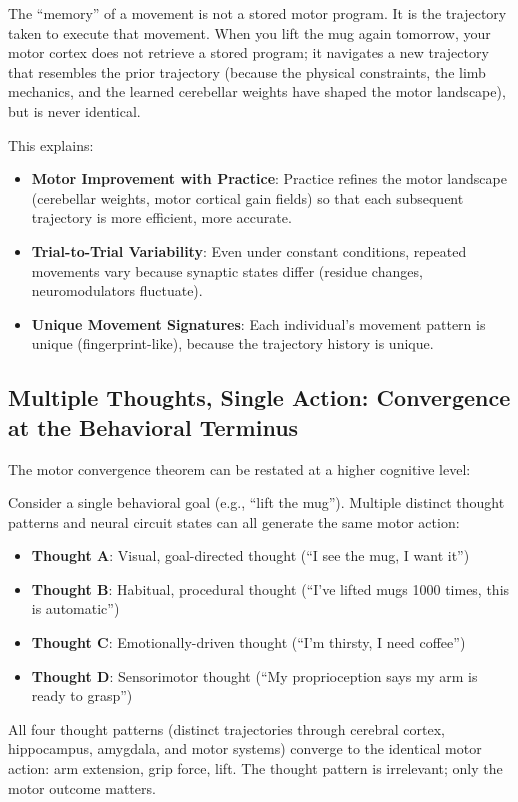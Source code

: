 \begin{corollary}
\label{cor:motor-memory}
The ``memory'' of a movement is not a stored motor program. It is the trajectory taken to execute that movement. When you lift the mug again tomorrow, your motor cortex does not retrieve a stored program; it navigates a new trajectory that resembles the prior trajectory (because the physical constraints, the limb mechanics, and the learned cerebellar weights have shaped the motor landscape), but is never identical.

This explains:
\begin{itemize}[noitemsep]
\item \textbf{Motor Improvement with Practice}: Practice refines the motor landscape (cerebellar weights, motor cortical gain fields) so that each subsequent trajectory is more efficient, more accurate.
\item \textbf{Trial-to-Trial Variability}: Even under constant conditions, repeated movements vary because synaptic states differ (residue changes, neuromodulators fluctuate).
\item \textbf{Unique Movement Signatures}: Each individual's movement pattern is unique (fingerprint-like), because the trajectory history is unique.
\end{itemize}
\end{corollary}

\subsection{Multiple Thoughts, Single Action: Convergence at the Behavioral Terminus}
\label{subsec:multiple-thoughts}

The motor convergence theorem can be restated at a higher cognitive level:

\begin{theorem}
\label{thm:thought-convergence}
Consider a single behavioral goal (e.g., ``lift the mug''). Multiple distinct thought patterns and neural circuit states can all generate the same motor action:

\begin{itemize}[noitemsep]
\item \textbf{Thought A}: Visual, goal-directed thought (``I see the mug, I want it'')
\item \textbf{Thought B}: Habitual, procedural thought (``I've lifted mugs 1000 times, this is automatic'')
\item \textbf{Thought C}: Emotionally-driven thought (``I'm thirsty, I need coffee'')
\item \textbf{Thought D}: Sensorimotor thought (``My proprioception says my arm is ready to grasp'')
\end{itemize}

All four thought patterns (distinct trajectories through cerebral cortex, hippocampus, amygdala, and motor systems) converge to the identical motor action: arm extension, grip force, lift. The thought pattern is irrelevant; only the motor outcome matters.
\end{theorem}

